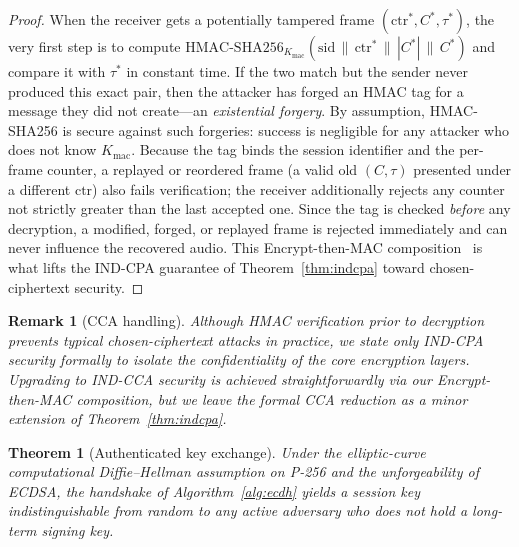 \documentclass[pdflatex,sn-mathphys-num]{sn-jnl}%
\theoremstyle{thmstyleone}%
\newtheorem{theorem}{Theorem}%
\theoremstyle{thmstyletwo}%
\newtheorem{remark}{Remark}%
\theoremstyle{thmstylethree}%
\begin{document}
\begin{proof}
When the receiver gets a potentially tampered frame $(\mathrm{ctr}^\ast, C^\ast,\tau^\ast)$, the very first step is to compute $\mathrm{HMAC\text{-}SHA256}_{K_{\mathrm{mac}}}(\mathrm{sid}\,\|\,\mathrm{ctr}^\ast\,\|\,|C^\ast|\,\|\,C^\ast)$ and compare it with $\tau^\ast$ in constant time. If the two match but the sender never produced this exact pair, then the attacker has forged an HMAC tag for a message they did not create---an \emph{existential forgery}. By assumption, HMAC-SHA256 is secure against such forgeries: success is negligible for any attacker who does not know $K_{\mathrm{mac}}$. Because the tag binds the session identifier and the per-frame counter, a replayed or reordered frame (a valid old $(C,\tau)$ presented under a different $\mathrm{ctr}$) also fails verification; the receiver additionally rejects any counter not strictly greater than the last accepted one. Since the tag is checked \emph{before} any decryption, a modified, forged, or replayed frame is rejected immediately and can never influence the recovered audio. This Encrypt-then-MAC composition~\cite{bellare2000} is what lifts the IND-CPA guarantee of Theorem~\ref{thm:indcpa} toward chosen-ciphertext security.
\end{proof}

\begin{remark}[CCA handling]
Although HMAC verification prior to decryption prevents typical chosen-ciphertext attacks in practice, we state only IND-CPA security formally to isolate the confidentiality of the core encryption layers. Upgrading to IND-CCA security is achieved straightforwardly via our Encrypt-then-MAC composition, but we leave the formal CCA reduction as a minor extension of Theorem~\ref{thm:indcpa}.
\end{remark}

\begin{theorem}[Authenticated key exchange]
\label{thm:ake}
Under the elliptic-curve computational Diffie--Hellman assumption on P-256 and the unforgeability of ECDSA, the handshake of Algorithm~\ref{alg:ecdh} yields a session key indistinguishable from random to any active adversary who does not hold a long-term signing key.
\end{theorem}
\end{document}
